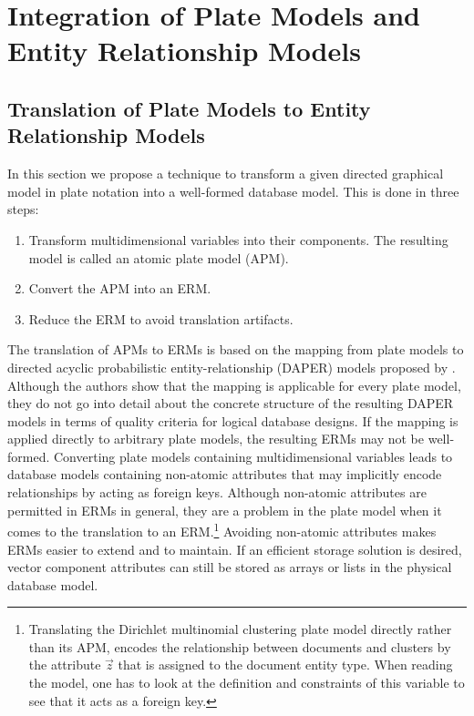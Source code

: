\section{Integration of Plate Models and Entity Relationship Models}

\subsection{Translation of Plate Models to Entity Relationship Models}
\label{sec:pm2erm}

In this section we propose a technique to transform a given directed graphical model in plate notation into a well-formed database model. This is done in three steps:
\begin{enumerate}
\item Transform multidimensional variables into their components. The resulting model is called an atomic plate model (APM).
\item\label{itm:apm2erm} Convert the APM into an ERM.
\item Reduce the ERM to avoid translation artifacts.
\end{enumerate}
The translation of APMs to ERMs is based on the mapping from plate models to directed acyclic probabilistic entity-relationship (DAPER) models proposed by \textcite{heckerman2007probabilistic}. Although the authors show that the mapping is applicable for every plate model, they do not go into detail about the concrete structure of the resulting DAPER models in terms of quality criteria for logical database designs. If the mapping is applied directly to arbitrary plate models, the resulting ERMs may not be well-formed. Converting plate models containing multidimensional variables leads to database models containing non-atomic attributes that may implicitly encode relationships by acting as foreign keys. Although non-atomic attributes are permitted in ERMs in general, they are a problem in the plate model when it comes to the translation to an ERM.\footnote{Translating the Dirichlet multinomial clustering plate model directly rather than its APM, encodes the relationship between documents and clusters by the attribute $\vec z$ that is assigned to the document entity type. When reading the model, one has to look at the definition and constraints of this variable to see that it acts as a foreign key.} Avoiding non-atomic attributes makes ERMs easier to extend and to maintain. If an efficient storage solution is desired, vector component attributes can still be stored as arrays or lists in the physical database model.

